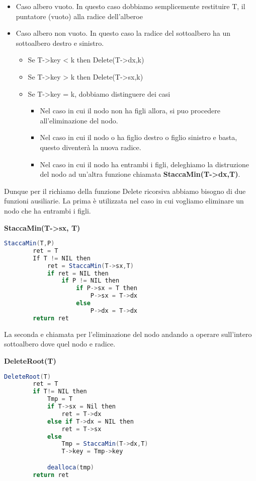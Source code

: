 \begin{itemize}
	\item Caso albero vuoto. In questo caso dobbiamo semplicemente restituire T, il puntatore (vuoto) alla radice dell'alberoe
	\item Caso albero non vuoto. In questo caso la radice del sottoalbero ha un sottoalbero destro e sinistro.
		\begin{itemize}
			\item Se T->key < k then Delete(T->dx,k)
			\item Se T->key > k then Delete(T->sx,k)
			\item Se T->key = k, dobbiamo distinguere dei casi
			\begin{itemize}
				\item Nel caso in cui il nodo non ha figli allora, si puo procedere all'eliminazione del nodo.
				\item Nel caso in cui il nodo o ha figlio destro o figlio sinistro e basta, questo diventerà la nuova radice. 
				\item Nel caso in cui il nodo ha entrambi i figli, deleghiamo la distruzione del nodo ad un'altra funzione chiamata \textbf{StaccaMin(T->dx,T)}.
			\end{itemize}
		\end{itemize}
\end{itemize}

Dunque per il richiamo della funzione Delete ricorsiva abbiamo bisogno di due funzioni ausiliarie. La prima è utilizzata nel caso in cui vogliamo eliminare un nodo che ha entrambi i figli.

\textbf{StaccaMin(T->sx, T)}

\begin{lstlisting}[language=Java]
	StaccaMin(T,P)
		ret = T
		If T != NIL then
			ret = StaccaMin(T->sx,T)
			if ret = NIL then
				if P != NIL then
					if P->sx = T then
						P->sx = T->dx
					else
						P->dx = T->dx
		return ret
\end{lstlisting}

La seconda e chiamata per l'eliminazione del nodo andando a operare sull'intero sottoalbero dove quel nodo e radice.

\textbf{DeleteRoot(T)}

\begin{lstlisting}[language=Java]
	DeleteRoot(T)
		ret = T
		if T!= NIL then
			Tmp = T
			if T->sx = Nil then
				ret = T->dx
			else if T->dx = NIL then
				ret = T->sx
			else
				Tmp = StaccaMin(T->dx,T)
				T->key = Tmp->key

			dealloca(tmp)
		return ret
\end{lstlisting}


